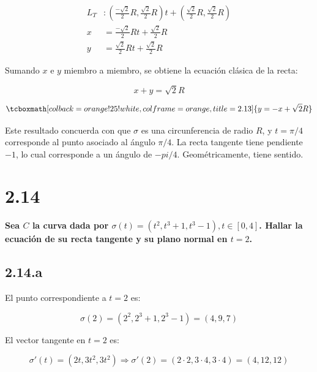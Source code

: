 \documentclass{article}
\begin{document}
\begin{subequations}
\begin{align}
L_T &: \left( \frac{-\sqrt{2}}{2} R, \frac{\sqrt{2}}{2} R \right) t + \left( \frac{\sqrt{2}}{2} R, \frac{\sqrt{2}}{2} R \right) \\
x &= \frac{-\sqrt{2}}{2} R t + \frac{\sqrt{2}}{2} R \\
y &= \frac{\sqrt{2}}{2} R t + \frac{\sqrt{2}}{2} R
\end{align}
\end{subequations}

Sumando $x$ e $y$ miembro a miembro, se obtiene la ecuación clásica de la recta:

\begin{equation}
x + y = \sqrt{2} R
\end{equation}

\begin{equation}
\tcboxmath[colback=orange!25!white,colframe=orange,title=2.13]
{
y = -x + \sqrt{2} R
}
\end{equation}

Este resultado concuerda con que $\sigma$ es una circunferencia de radio $R$, y $t = \pi/4$ corresponde al punto asociado al ángulo $\pi/4$. La recta tangente tiene pendiente $-1$, lo cual corresponde a un ángulo de $-pi/4$. Geométricamente, tiene sentido.

\section*{2.14}
\label{sec:2.14}

\textbf{Sea $C$ la curva dada por $\sigma(t) = (t^2, t^3 + 1, t^3-1), t \in [0, 4]$. Hallar la ecuación de su recta tangente y su plano normal en $t = 2$.}

\subsection*{2.14.a}
\label{subsec:2.14.a}

El punto correspondiente a $t = 2$ es:

\begin{equation}
\sigma(2) = (2^2, 2^3+1, 2^3-1) = (4, 9, 7)
\end{equation}

El vector tangente en $t = 2$ es:

\begin{equation}
\sigma'(t) = (2t, 3t^2, 3t^2) \Rightarrow \sigma'(2) = (2 \cdot 2, 3 \cdot 4, 3 \cdot 4) = (4, 12, 12)
\end{equation}
\end{document}
